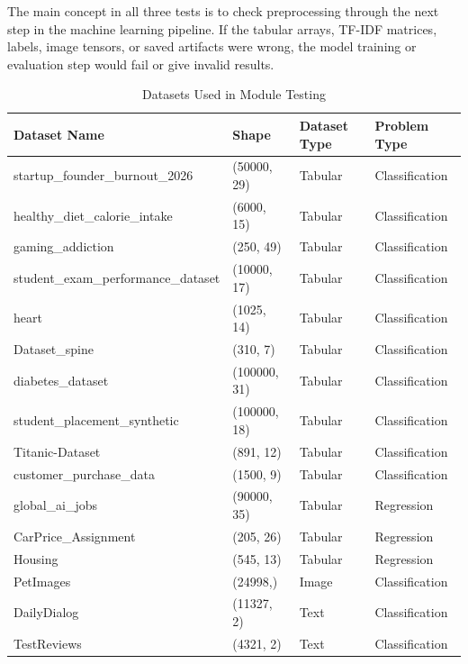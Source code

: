 \documentclass[12pt,a4paper,oneside]{report}
\begin{document}
\noindent The main concept in all three tests is to check preprocessing through
the next step in the machine learning pipeline. If the tabular arrays, TF-IDF
matrices, labels, image tensors, or saved artifacts were wrong, the model
training or evaluation step would fail or give invalid results. 

\begin{table}[H]
\centering
\caption{Datasets Used in Module Testing}
\label{tab:module_testing_datasets}
\small
\renewcommand{\arraystretch}{1.15}
\begin{tabularx}{\textwidth}{@{}
>{\raggedright\arraybackslash}X
>{\centering\arraybackslash}p{}
>{\centering\arraybackslash}p{}
>{\centering\arraybackslash}p{}
@{}}
\hline
\textbf{Dataset Name} & \textbf{Shape} & \textbf{Dataset Type} & \textbf{Problem Type} \\
\hline
startup\_founder\_burnout\_2026 & (50000, 29) & Tabular & Classification \\
\hline
healthy\_diet\_calorie\_intake & (6000, 15) & Tabular & Classification \\
\hline
gaming\_addiction & (250, 49) & Tabular & Classification \\
\hline
student\_exam\_performance\_dataset & (10000, 17) & Tabular & Classification \\
\hline
heart & (1025, 14) & Tabular & Classification \\
\hline
Dataset\_spine & (310, 7) & Tabular & Classification \\
\hline
diabetes\_dataset & (100000, 31) & Tabular & Classification \\
\hline
student\_placement\_synthetic & (100000, 18) & Tabular & Classification \\
\hline
Titanic-Dataset & (891, 12) & Tabular & Classification \\
\hline
customer\_purchase\_data & (1500, 9) & Tabular & Classification \\
\hline
global\_ai\_jobs & (90000, 35) & Tabular & Regression \\
\hline
CarPrice\_Assignment & (205, 26) & Tabular & Regression \\
\hline
Housing & (545, 13) & Tabular & Regression \\
\hline
PetImages & (24998,) & Image & Classification \\
\hline
DailyDialog & (11327, 2) & Text & Classification \\
\hline
TestReviews & (4321, 2) & Text & Classification \\
\hline
\end{tabularx}
\normalsize
\renewcommand{\arraystretch}{1.0}
\end{table}
\end{document}
